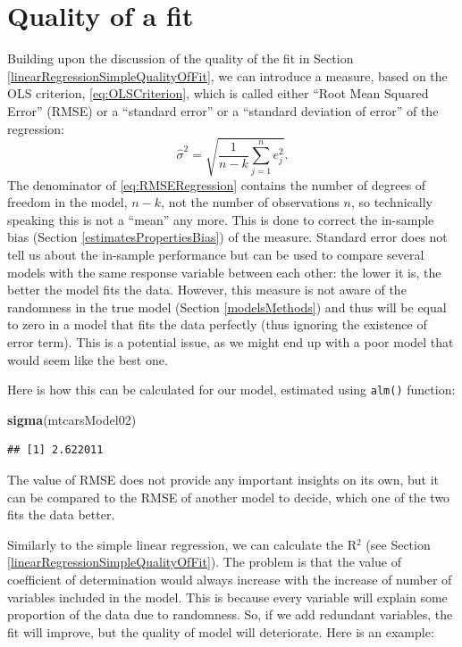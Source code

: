 \documentclass[
]{book}
\newenvironment{Shaded}{\begin{snugshade}}{\end{snugshade}}
\newcommand{\KeywordTok}[1]{\textcolor[rgb]{0.13,0.29,0.53}{\textbf{#1}}}
\newcommand{\NormalTok}[1]{#1}
\theoremstyle{definition}
\theoremstyle{definition}
\theoremstyle{definition}
\theoremstyle{definition}
\theoremstyle{remark}
\begin{document}
\hypertarget{linearRegressionMultipleQualityOfFit}{%
\section{Quality of a fit}\label{linearRegressionMultipleQualityOfFit}}

Building upon the discussion of the quality of the fit in Section \ref{linearRegressionSimpleQualityOfFit}, we can introduce a measure, based on the OLS criterion, \eqref{eq:OLSCriterion}, which is called either ``Root Mean Squared Error'' (RMSE) or a ``standard error'' or a ``standard deviation of error'' of the regression:
\begin{equation}
    \hat{\sigma}^2 = \sqrt{\frac{1}{n-k} \sum_{j=1}^n e_j^2 }.
    \label{eq:RMSERegression}
\end{equation}
The denominator of \eqref{eq:RMSERegression} contains the number of degrees of freedom in the model, \(n-k\), not the number of observations \(n\), so technically speaking this is not a ``mean'' any more. This is done to correct the in-sample bias (Section \ref{estimatesPropertiesBias}) of the measure. Standard error does not tell us about the in-sample performance but can be used to compare several models with the same response variable between each other: the lower it is, the better the model fits the data. However, this measure is not aware of the randomness in the true model (Section \ref{modelsMethods}) and thus will be equal to zero in a model that fits the data perfectly (thus ignoring the existence of error term). This is a potential issue, as we might end up with a poor model that would seem like the best one.

Here is how this can be calculated for our model, estimated using \texttt{alm()} function:

\begin{Shaded}
\begin{Highlighting}[]
\KeywordTok{sigma}\NormalTok{(mtcarsModel02)}
\end{Highlighting}
\end{Shaded}

\begin{verbatim}
## [1] 2.622011
\end{verbatim}

The value of RMSE does not provide any important insights on its own, but it can be compared to the RMSE of another model to decide, which one of the two fits the data better.

Similarly to the simple linear regression, we can calculate the R\(^2\) (see Section \ref{linearRegressionSimpleQualityOfFit}). The problem is that the value of coefficient of determination would always increase with the increase of number of variables included in the model. This is because every variable will explain some proportion of the data due to randomness. So, if we add redundant variables, the fit will improve, but the quality of model will deteriorate. Here is an example:
\end{document}
